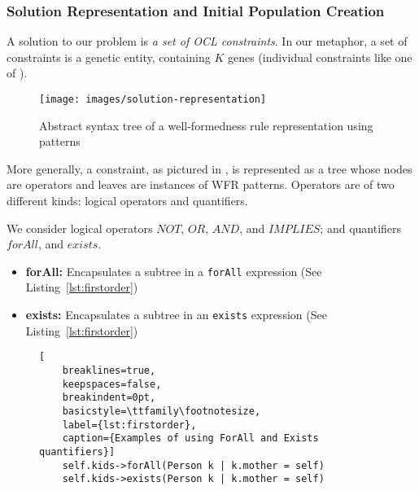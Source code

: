 \subsubsection{Solution Representation and Initial Population Creation}\label{sec:solcreation}
A solution to our problem is \textit{a set of OCL constraints}.
In our metaphor, a set of constraints is a genetic entity, containing $K$ genes (individual constraints like one of ).

\begin{figure}[h]
	\centering
	\texttt{[image: images/solution-representation]}
	\caption{Abstract syntax tree of a well-formedness rule representation using patterns}
	\label{fig:representation-general}
\end{figure}
More generally, a constraint, as pictured in , is represented as a tree whose nodes are operators and leaves are instances of WFR patterns. Operators are of two different kinds: logical operators and quantifiers.

\begin{definition}
	We consider logical operators $NOT$, $OR$, $AND$, and $IMPLIES$; and quantifiers $forAll$, and $exists$.
	\begin{itemize}
		\item \textbf{forAll:} Encapsulates a subtree in a \texttt{forAll} expression (See Listing~\ref{lst:firstorder})
		\item \textbf{exists:} Encapsulates a subtree in an \texttt{exists} expression (See Listing~\ref{lst:firstorder})
	\end{itemize}

\begin{figure}[h]
	\centering
	\begin{lstlisting}[
	breaklines=true,
	keepspaces=false,
	breakindent=0pt,
	basicstyle=\ttfamily\footnotesize,
	label={lst:firstorder},
	caption={Examples of using ForAll and Exists quantifiers}]
	self.kids->forAll(Person k | k.mother = self)
	self.kids->exists(Person k | k.mother = self)
	\end{lstlisting}
\end{figure}
\end{definition}

